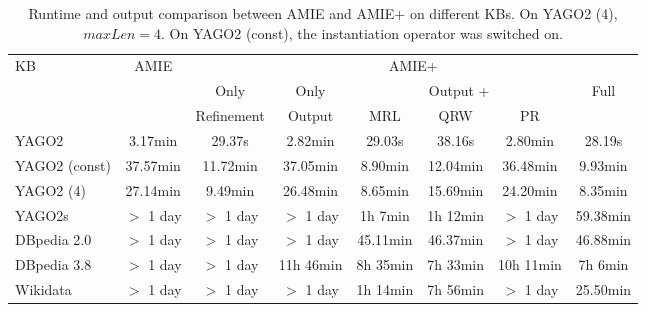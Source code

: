 \begin{savenotes}
\begin{table}[t]
\centering
\footnotesize
\begin{tabular}{|l|c|c|c|c|c|c|c|}
\hline
\multirow{3}{*}{KB} 	& \multirow{3}{*}{AMIE}  	& \multicolumn{6}{c|}{AMIE+} 	\\ \cline{3-8}
 			& 				& Only	& Only		& \multicolumn{3}{c|}{Output +}   										& \multirow{2}{*}{Full}  \\ \cline{5-7}
			&  				& Refinement			&   Output				& MRL     			&QRW 		&PR				& 	   	   	\\ \hline
  YAGO2  		& 3.17min  			&29.37s				& 2.82min  			& 29.03s  	 		&38.16s 	&2.80min  			& 28.19s	   	\\ \hline
  YAGO2 (const)  	& 37.57min  			&11.72min			& 37.05min 			& 8.90min  			&12.04min 	&36.48min  			& 9.93min	   	\\ \hline
  YAGO2 (4)  		& 27.14min  			&9.49min			& 26.48min 			& 8.65min  			&15.69min 	&24.20min  			& 8.35min 	   	\\ \hline
  YAGO2s  		& $>$ 1 day  			&$>$ 1 day			&$>$ 1 day 			& 1h 7min  		    	&1h 12min	&$>$ 1 day  			& 59.38min	   	\\ \hline
  DBpedia 2.0  		& $>$ 1 day  			&$>$ 1 day			&$>$ 1 day 			& 45.11min  		    	&46.37min       &$>$ 1 day  			& 46.88min	   	\\ \hline
  DBpedia 3.8  		& $>$ 1 day  			&$>$ 1 day			&11h 46min			& 8h 35min 			&7h 33min	&10h 11min  			& 7h 6min 	   	\\ \hline
  Wikidata  		& $>$ 1 day  			&$>$ 1 day			&$>$ 1 day 			& 1h 14min 			&7h 56min	&$>$ 1 day	  		& 25.50min	   	\\ \hline
\end{tabular}
\caption{Runtime and output comparison between AMIE and AMIE+ on different KBs. On YAGO2 (4), $maxLen=4$. On YAGO2 (const), the instantiation operator was switched on.}
\label{amievsplus}
\end{table}
\end{savenotes}

